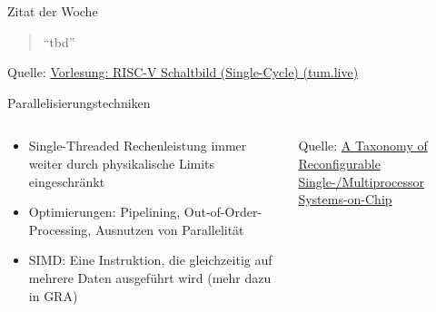 \documentclass[
  german,            %
  aspectratio=169,    %
]{tumbeamer}
\begin{document}
\begin{frame}[c, fragile]{}{}
  \begin{center}
    \vspace{0.5cm}
    \begin{block}{Zitat der Woche}
      \vspace{0.5cm}
      \begin{quote}
        \enquote{tbd}
        \vspace{0.5cm}
      \end{quote}
      \vspace{0.5cm}
    \end{block}
    \vspace{0.5cm}
    Quelle: \href{https://tum.live/w/ws24EidR/50026?t=5585}{Vorlesung: RISC-V Schaltbild (Single-Cycle) (tum.live)}
\end{center}
\end{frame}


\begin{frame}[c, fragile]{Parallelisierungstechniken}{}
	\begin{columns}[c]
		\begin{column}{0.5\textwidth}
			\begin{itemize}
				\item Single-Threaded Rechenleistung immer weiter durch physikalische Limits eingeschränkt
				\item Optimierungen: Pipelining, Out-of-Order-Processing, Ausnutzen von Parallelität
				\item SIMD: Eine Instruktion, die gleichzeitig auf mehrere Daten ausgeführt wird (mehr dazu in GRA)

			\end{itemize}
		\end{column}
		\begin{column}{0.5\textwidth}
			\begin{center}
			\end{center}
			\centering
			\tiny{Quelle: \href{https://www.researchgate.net/publication/26639095_A_Taxonomy_of_Reconfigurable_Single-Multiprocessor_Systems-on-Chip}{A Taxonomy of Reconfigurable Single-/Multiprocessor\\Systems-on-Chip}}
		\end{column}
	\end{columns}
\end{frame}
\end{document}
